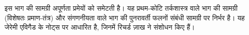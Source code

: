 \documentclass[../../include/open-logic-part]{subfiles}
\begin{document}

\begin{editorial}
 इस भाग की सामग्री अपूर्णता प्रमेयों को समेटती है। यह प्रथम-कोटि
 तर्कशास्त्र वाले भाग की सामग्री (विशेषतः प्रमाण-तंत्र) और संगणनीयता वाले
 भाग की पुनरावर्ती फलनों संबंधी सामग्री पर निर्भर है। यह जेरेमी एविगैड के
 नोट्स पर आधारित है, जिनमें रिचर्ड ज़ाख ने संशोधन किए हैं।
\end{editorial}






\OLEndPartHook
\end{document}
